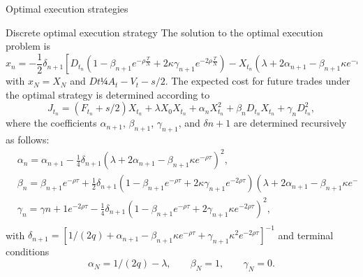 \documentclass[]{beamer}
\begin{document}
\begin{frame}[t]
\begin{columns}[t]
\begin{column}{\onecolwid}
\begin{block}{Optimal execution strategies }
            \begin{alertblock}{Discrete optimal execution strategy}
                The solution to the optimal execution problem is
                \begin{equation*}
                    x_n = - \frac{1}{2} \delta_{n + 1} [D_{t_n} (1 - \beta_{n + 1} e^{ - \rho \frac{T}{N}} + 2 \kappa \gamma_{n+1} e^{ - 2 \rho \frac{T}{N}}) 
                    - X_{t_n} (\lambda + 2 \alpha_{n+1} - \beta_{n+1}\kappa e^{ - \rho \frac{T}{N}}) ], 
                \end{equation*}
                with $x_N = X_N$ and $Dt ¼ A_t - V_t - s/2$. The expected cost for future trades under the optimal
                strategy is determined according to
                \begin{equation*}
                    J_{t_n} = (F_{t_n} + s/2) X_{t_n} + \lambda X_0 X_{t_n} + \alpha_n X_{t_n} ^2 + \beta_{n} D_{t_n} X_{t_n} + \gamma_n D_{t_n}^2, 
                \end{equation*}
                where the coefficients $\alpha_{n+1}$, $\beta_{n+1}$, $\gamma_{n+1}$, and $\delta{n+1}$ are determined recursively as follows:
                \begin{align*}
                    & \alpha_{n} = \alpha_{n+1} - \frac{1}{4} \delta _{n+1} (\lambda + 2 \alpha_{n+1} - \beta_{n+1} \kappa e^{- \rho \tau})^2, \\
                    & \beta_{n} =  \beta_{n+1} e^{- \rho \tau}  + \frac{1}{2} \delta _{n+1} (1 - \beta_{n+1} e^{- \rho \tau} 
                        + 2 \kappa \gamma_{n+1} e^{- 2 \rho \tau}) (\lambda + 2 \alpha_{n+1} - \beta_{n+1} \kappa e^{-\rho \tau}), \\
                    & \gamma_n =   \gamma{n+1} e^{- 2 \rho \tau} - \frac{1}{4} \delta _{n+1} (1 - \beta _{n+1} e^{- \rho \tau} 
                + 2 \gamma _{n+1} \kappa e^{- 2 \rho \tau})^2, \\
                \end{align*}
                with $\delta_{n+1} = [1/(2q) + \alpha_{n+1} - \beta_{n+1} \kappa e^{-\rho \tau} + \gamma _{n+1} \kappa ^2 e^{- 2 \rho \tau}]^{-1}$ and terminal conditions
                \begin{equation*}
                    \alpha_{N} = 1/(2q) - \lambda, \;\;\;\;\;\;\; \beta_N = 1, \;\;\;\;\;\;\; \gamma_N = 0.
                \end{equation*}
            \end{alertblock}
    
            

\end{block}
\end{column}
\end{columns}
\end{frame}
\end{document}
